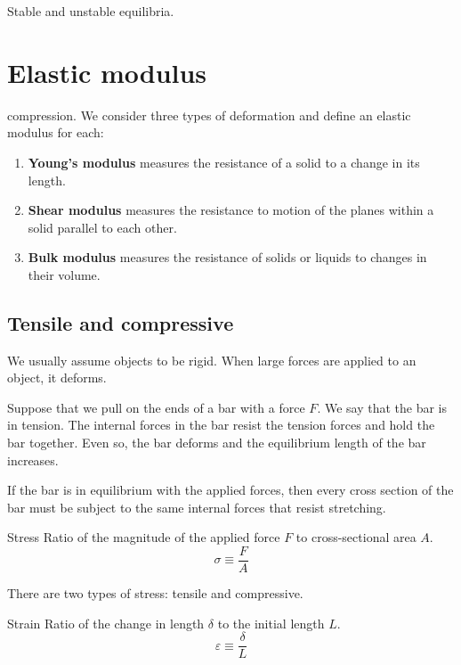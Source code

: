Stable and unstable equilibria.
\pagebreak

\section{Elastic modulus}
compression.
We consider three types of deformation and define an elastic modulus for each:
\begin{enumerate}
\item \textbf{Young's modulus} measures the resistance of a solid to a change in its length.
\item \textbf{Shear modulus} measures the resistance to motion of the planes within a solid parallel to each other.
\item \textbf{Bulk modulus} measures the resistance of solids or liquids to changes in their volume.
\end{enumerate}

\subsection{Tensile and compressive}
We usually assume objects to be rigid. When large forces are applied to an object, it deforms. 

Suppose that we pull on the ends of a bar with a force $F$. We say that the bar is in tension. The internal forces in the bar resist the tension forces and hold the bar together. Even so, the bar deforms and the equilibrium length of the bar increases. 

If the bar is in equilibrium with the applied forces, then every cross section of the bar must be subject to the same internal forces that resist stretching.

\begin{defn}{Stress}{}
Ratio of the magnitude of the applied force $F$ to cross-sectional area $A$.
\begin{equation}
\sigma \equiv \frac{F}{A}
\end{equation}
\end{defn}

\begin{remark}
There are two types of stress: tensile and compressive.
\end{remark}

\begin{defn}{Strain}{}
Ratio of the change in length $\delta$ to the initial length $L$.
\begin{equation}
\varepsilon \equiv \frac{\delta}{L}
\end{equation}
\end{defn}

